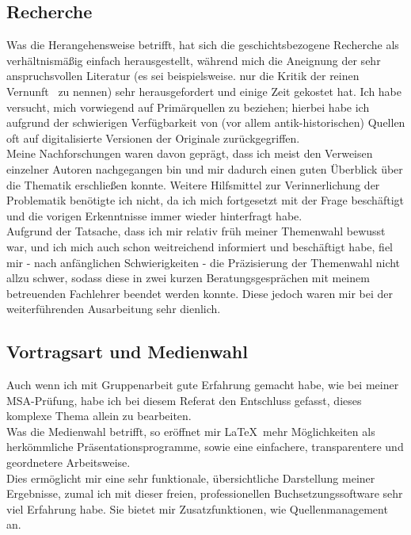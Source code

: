 \documentclass[12pt,a4paper,final]{article}
\begin{document}
\subsection*{Recherche}
Was die Herangehensweise betrifft, hat sich die geschichtsbezogene Recherche als verhältnismäßig einfach herausgestellt, während mich die Aneignung der sehr anspruchsvollen Literatur (es sei beispielsweise. nur die \glqq Kritik der reinen Vernunft\grqq\ \cite{kritik}
 zu nennen) sehr herausgefordert und einige Zeit gekostet hat. Ich habe versucht, mich vorwiegend auf Primärquellen zu beziehen; hierbei habe ich aufgrund der schwierigen Verfügbarkeit von (vor allem antik-historischen) Quellen oft auf digitalisierte Versionen der Originale zurückgegriffen.\\
Meine Nachforschungen waren davon geprägt, dass ich meist den Verweisen einzelner Autoren nachgegangen bin und mir dadurch einen guten Überblick über die Thematik erschließen konnte. Weitere Hilfsmittel zur Verinnerlichung der Problematik benötigte ich nicht, da ich mich fortgesetzt mit der Frage beschäftigt und die vorigen Erkenntnisse immer wieder hinterfragt habe.\\

Aufgrund der Tatsache, dass ich mir relativ früh meiner Themenwahl bewusst war, und ich mich auch schon weitreichend informiert und beschäftigt habe, fiel mir - nach anfänglichen Schwierigkeiten - die Präzisierung der Themenwahl nicht allzu schwer, sodass diese in zwei kurzen Beratungsgesprächen mit meinem betreuenden Fachlehrer beendet werden konnte. Diese jedoch waren mir bei der weiterführenden Ausarbeitung sehr dienlich.

\subsection*{Vortragsart und Medienwahl}
Auch wenn ich mit Gruppenarbeit gute Erfahrung gemacht habe, wie bei meiner MSA-Prüfung, 
habe ich bei diesem Referat den Entschluss gefasst, dieses komplexe Thema allein zu bearbeiten.\\
Was die Medienwahl betrifft, so eröffnet mir \LaTeX\ mehr Möglichkeiten als herkömmliche Präsentationsprogramme, sowie eine einfachere, transparentere und geordnetere Arbeitsweise.\\
Dies ermöglicht mir eine sehr funktionale, übersichtliche Darstellung meiner Ergebnisse, zumal ich mit dieser freien, professionellen Buchsetzungssoftware sehr viel Erfahrung habe. Sie bietet mir Zusatzfunktionen, wie Quellenmanagement an.
\end{document}
